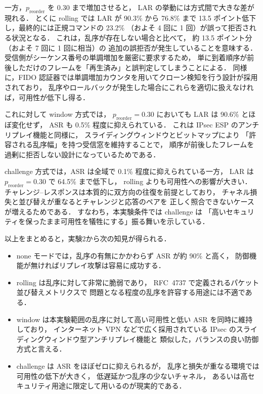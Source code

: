 \documentclass[twocolumn,10pt,a4paper]{jsarticle}
\begin{document}
一方，$p_{\mathrm{reorder}}$ を 0.30 まで増加させると，
LAR の挙動には方式間で大きな差が現れる．
とくに rolling では LAR が 90.3\% から 76.8\% まで
13.5 ポイント低下し，最終的には正規コマンドの 23.2\%
（およそ 4 回に 1 回）が誤って拒否される状況となる．
これは，乱序が存在しない場合と比べて，
約 13.5 ポイント分（およそ 7 回に 1 回に相当）の
追加の誤拒否が発生していることを意味する．
受信側がシーケンス番号の単調増加を厳密に要求するため，
単に到着順序が前後しただけのフレームを「再生済み」と誤判定してしまうことによる．
同様に，FIDO 認証器では単調増加カウンタを用いてクローン検知を行う設計が採用されており\cite{fido-security-ref}，
乱序やロールバックが発生した場合にこれらを適切に扱えなければ，可用性が低下し得る．

これに対して window 方式では，
$p_{\mathrm{reorder}} = 0.30$ においても LAR は 90.6\% とほぼ変化せず，
ASR も 0.5\% 程度に抑えられている．
これは IPsec ESP のアンチリプレイ機能と同様に，
スライディングウィンドウとビットマップにより
「許容される乱序幅」を持つ受信窓を維持することで，
順序が前後したフレームを過剰に拒否しない設計になっているためである\cite{rfc4303,rfc6479}．

challenge 方式では，ASR は全域で 0.1\% 程度に抑えられている一方，
LAR は $p_{\mathrm{reorder}} = 0.30$ で 64.5\% まで低下し，
rolling よりも可用性への影響が大きい．
チャレンジ--レスポンスは本質的に双方向の往復を前提としており，
チャネル損失と並び替えが重なるとチャレンジと応答のペアを
正しく照合できないケースが増えるためである．
すなわち，本実験条件では challenge は
「高いセキュリティを保ったまま可用性を犠牲にする」振る舞いを示している．

以上をまとめると，実験2から次の知見が得られる．
\begin{itemize}
  \item none モードでは，乱序の有無にかかわらず ASR が約 90\% と高く，
        防御機能が無ければリプレイ攻撃は容易に成功する．
  \item rolling は乱序に対して非常に脆弱であり，
        RFC~4737 で定義されるパケット並び替えメトリクス\cite{rfc4737}で
        問題となる程度の乱序を許容する用途には不適である．
  \item window は本実験範囲の乱序に対して高い可用性と低い ASR を同時に維持しており，
        インターネット VPN などで広く採用されている
        IPsec のスライディングウィンドウ型アンチリプレイ機能と
        類似した，バランスの良い防御方式と言える\cite{rfc4303,rfc6479}．
  \item challenge は ASR をほぼゼロに抑えられるが，
        乱序と損失が重なる環境では可用性の低下が大きく，
        低遅延かつ乱序の少ないチャネル，
        あるいは高セキュリティ用途に限定して用いるのが現実的である．
\end{itemize}
\end{document}
